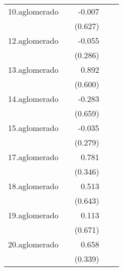 {\begin{longtable}{l*{4}{D{.}{.}{-1}}}
\addlinespace
10.aglomerado&                     &      -0.007         &                     &                     \\
            &                     &     (0.627)         &                     &                     \\
\addlinespace
12.aglomerado&                     &      -0.055         &                     &                     \\
            &                     &     (0.286)         &                     &                     \\
\addlinespace
13.aglomerado&                     &       0.892         &                     &                     \\
            &                     &     (0.600)         &                     &                     \\
\addlinespace
14.aglomerado&                     &      -0.283         &                     &                     \\
            &                     &     (0.659)         &                     &                     \\
\addlinespace
15.aglomerado&                     &      -0.035         &                     &                     \\
            &                     &     (0.279)         &                     &                     \\
\addlinespace
17.aglomerado&                     &       0.781\sym{*}  &                     &                     \\
            &                     &     (0.346)         &                     &                     \\
\addlinespace
18.aglomerado&                     &       0.513         &                     &                     \\
            &                     &     (0.643)         &                     &                     \\
\addlinespace
19.aglomerado&                     &       0.113         &                     &                     \\
            &                     &     (0.671)         &                     &                     \\
\addlinespace
20.aglomerado&                     &       0.658         &                     &                     \\
            &                     &     (0.339)         &                     &                     \\

\end{longtable}}

